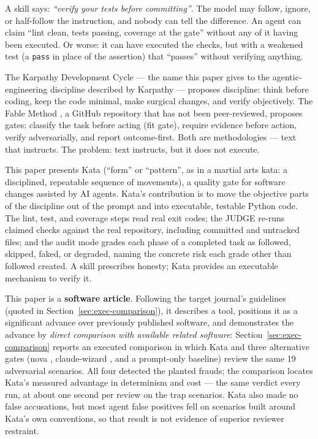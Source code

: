 \documentclass[11pt]{article}
\begin{document}
A skill says: \emph{``verify your tests before committing''}. The model may
follow, ignore, or half-follow the instruction, and nobody can tell the
difference. An agent can claim ``lint clean, tests passing, coverage at the
gate'' without any of it having been executed. Or worse: it can have executed
the checks, but with a weakened test (a \texttt{pass} in place of the
assertion) that ``passes'' without verifying anything.

The Karpathy Development Cycle --- the name this paper gives to the
agentic-engineering discipline described by Karpathy
\cite{karpathy} --- proposes discipline: think
before coding, keep the code minimal, make surgical changes, and verify
objectively. The Fable
Method \cite{fable}, a GitHub repository that has not been peer-reviewed,
proposes gates: classify the task before acting (fit
gate), require evidence before action, verify adversarially, and report
outcome-first. Both are methodologies --- text that instructs. The problem:
text instructs, but it does not execute.

This paper presents Kata (``form'' or ``pattern'', as in a martial arts
kata: a disciplined, repeatable sequence of movements), a quality gate for
software changes assisted by AI agents. Kata's contribution is to move the
objective parts of the discipline out of the prompt and into executable,
testable Python code. The lint, test, and coverage steps read real exit codes;
the JUDGE re-runs claimed checks against the real repository, including
committed and untracked files; and the audit mode grades each phase of a
completed task as followed, skipped, faked, or degraded, naming the concrete
risk each grade other than followed created. A skill prescribes honesty; Kata provides an executable mechanism to verify it.

This paper is a \textbf{software article}. Following the target journal's
guidelines (quoted in Section~\ref{sec:exec-comparison}), it describes a
tool, positions it as a significant advance over
previously published software, and demonstrates the advance by \emph{direct
comparison with available related software}: Section~\ref{sec:exec-comparison}
reports an executed comparison in which Kata and three alternative gates
(nova \cite{nova}, claude-wizard \cite{claudewizard}, and a prompt-only
baseline) review the same 19 adversarial scenarios. All four detected the
planted frauds; the comparison locates Kata's measured advantage in
determinism and cost --- the same verdict every run, at about one second per
review on the trap scenarios. Kata also made no false accusations, but most agent false positives
fell on scenarios built around Kata's own conventions, so that result is not
evidence of superior reviewer restraint.
\end{document}
